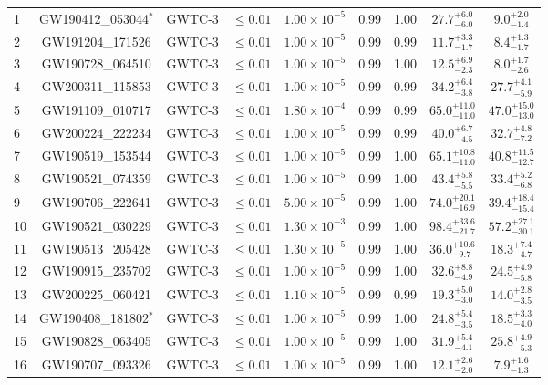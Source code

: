 \begin{table}[t]
\begin{threeparttable}
\begin{tabular}{!{\vrule width 1pt}lcccccccc!{\vrule width 1pt}}
1 & GW190412\_053044$^{*}$ & GWTC-3 & $\leq 0.01$ & $1.00 \times 10^{-5}$ & 0.99 & 1.00 & $27.7^{+6.0}_{-6.0}$ & $9.0^{+2.0}_{-1.4}$ \\
2 & GW191204\_171526 & GWTC-3 & $\leq 0.01$ & $1.00 \times 10^{-5}$ & 0.99 & 0.99 & $11.7^{+3.3}_{-1.7}$ & $8.4^{+1.3}_{-1.7}$ \\
3 & GW190728\_064510 & GWTC-3 & $\leq 0.01$ & $1.00 \times 10^{-5}$ & 0.99 & 1.00 & $12.5^{+6.9}_{-2.3}$ & $8.0^{+1.7}_{-2.6}$ \\
4 & GW200311\_115853 & GWTC-3 & $\leq 0.01$ & $1.00 \times 10^{-5}$ & 0.99 & 0.99 & $34.2^{+6.4}_{-3.8}$ & $27.7^{+4.1}_{-5.9}$ \\
5 & GW191109\_010717 & GWTC-3 & $\leq 0.01$ & $1.80 \times 10^{-4}$ & 0.99 & 0.99 & $65.0^{+11.0}_{-11.0}$ & $47.0^{+15.0}_{-13.0}$ \\
6 & GW200224\_222234 & GWTC-3 & $\leq 0.01$ & $1.00 \times 10^{-5}$ & 0.99 & 0.99 & $40.0^{+6.7}_{-4.5}$ & $32.7^{+4.8}_{-7.2}$ \\
7 & GW190519\_153544 & GWTC-3 & $\leq 0.01$ & $1.00 \times 10^{-5}$ & 0.99 & 1.00 & $65.1^{+10.8}_{-11.0}$ & $40.8^{+11.5}_{-12.7}$ \\
8 & GW190521\_074359 & GWTC-3 & $\leq 0.01$ & $1.00 \times 10^{-5}$ & 0.99 & 1.00 & $43.4^{+5.8}_{-5.5}$ & $33.4^{+5.2}_{-6.8}$ \\
9 & GW190706\_222641 & GWTC-3 & $\leq 0.01$ & $5.00 \times 10^{-5}$ & 0.99 & 1.00 & $74.0^{+20.1}_{-16.9}$ & $39.4^{+18.4}_{-15.4}$ \\
10 & GW190521\_030229 & GWTC-3 & $\leq 0.01$ & $1.30 \times 10^{-3}$ & 0.99 & 1.00 & $98.4^{+33.6}_{-21.7}$ & $57.2^{+27.1}_{-30.1}$ \\
11 & GW190513\_205428 & GWTC-3 & $\leq 0.01$ & $1.30 \times 10^{-5}$ & 0.99 & 1.00 & $36.0^{+10.6}_{-9.7}$ & $18.3^{+7.4}_{-4.7}$ \\
12 & GW190915\_235702 & GWTC-3 & $\leq 0.01$ & $1.00 \times 10^{-5}$ & 0.99 & 1.00 & $32.6^{+8.8}_{-4.9}$ & $24.5^{+4.9}_{-5.8}$ \\
13 & GW200225\_060421 & GWTC-3 & $\leq 0.01$ & $1.10 \times 10^{-5}$ & 0.99 & 0.99 & $19.3^{+5.0}_{-3.0}$ & $14.0^{+2.8}_{-3.5}$ \\
14 & GW190408\_181802$^{*}$ & GWTC-3 & $\leq 0.01$ & $1.00 \times 10^{-5}$ & 0.99 & 1.00 & $24.8^{+5.4}_{-3.5}$ & $18.5^{+3.3}_{-4.0}$ \\
15 & GW190828\_063405 & GWTC-3 & $\leq 0.01$ & $1.00 \times 10^{-5}$ & 0.99 & 1.00 & $31.9^{+5.4}_{-4.1}$ & $25.8^{+4.9}_{-5.3}$ \\
16 & GW190707\_093326 & GWTC-3 & $\leq 0.01$ & $1.00 \times 10^{-5}$ & 0.99 & 1.00 & $12.1^{+2.6}_{-2.0}$ & $7.9^{+1.6}_{-1.3}$ \\

\end{tabular}
\end{threeparttable}
\end{table}
